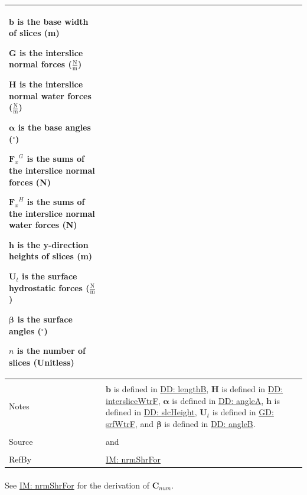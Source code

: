 \documentclass[12pt]{article}
\begin{document}
\begin{minipage}{\textwidth}
\begin{tabular}{>{\raggedright}p{}>{\raggedright\arraybackslash}p{}}
\begin{symbDescription}
                        \item{$\mathbf{b}$ is the base width of slices (m)}
                        \item{$\mathbf{G}$ is the interslice normal forces ($\frac{\text{N}}{\text{m}}$)}
                        \item{$\mathbf{H}$ is the interslice normal water forces ($\frac{\text{N}}{\text{m}}$)}
                        \item{$\mathbf{α}$ is the base angles (${}^{\circ}$)}
                        \item{${{\mathbf{F}_{x}}^{G}}$ is the sums of the interslice normal forces (N)}
                        \item{${{\mathbf{F}_{x}}^{H}}$ is the sums of the interslice normal water forces (N)}
                        \item{$\mathbf{h}$ is the y-direction heights of slices (m)}
                        \item{${\mathbf{U}_{t}}$ is the surface hydrostatic forces ($\frac{\text{N}}{\text{m}}$)}
                        \item{$\mathbf{β}$ is the surface angles (${}^{\circ}$)}
                        \item{$n$ is the number of slices (Unitless)}
                        \end{symbDescription}
          \\ \midrule \\
          Notes & $\mathbf{b}$ is defined in \hyperref[DD:lengthB]{DD: lengthB}, $\mathbf{H}$ is defined in \hyperref[DD:intersliceWtrF]{DD: intersliceWtrF}, $\mathbf{α}$ is defined in \hyperref[DD:angleA]{DD: angleA}, $\mathbf{h}$ is defined in \hyperref[DD:slcHeight]{DD: slcHeight}, ${\mathbf{U}_{t}}$ is defined in \hyperref[GD:srfWtrF]{GD: srfWtrF}, and $\mathbf{β}$ is defined in \hyperref[DD:angleB]{DD: angleB}.
          \\ \midrule \\
          Source & \cite{chen2005} and \cite{karchewski2012}
          \\ \midrule \\
          RefBy & \hyperref[IM:nrmShrFor]{IM: nrmShrFor}
          \\ \bottomrule
          \end{tabular}
          \end{minipage}
\paragraph{}
\label{IM:nrmShrForNumDeriv}
See \hyperref[IM:nrmShrFor]{IM: nrmShrFor} for the derivation of ${\mathbf{C}_{num}}$.
\par~
\end{document}

